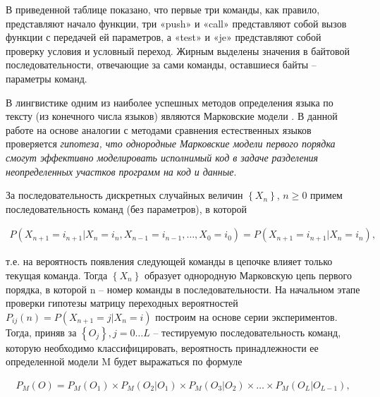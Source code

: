 \documentclass{book}
\begin{document}
В приведенной таблице показано, что первые три команды, как правило, представляют начало 
функции, три «push» и «call» представляют собой вызов функции с передачей ей параметров, 
а «test» и «je» представляют собой проверку условия и условный переход. Жирным выделены 
значения в байтовой последовательности, отвечающие за сами команды, оставшиеся байты – 
параметры команд.

В лингвистике одним из наиболее успешных методов определения языка по тексту
(из конечного числа языков) являются Марковские модели \cite{Silic}. 
В данной работе на основе аналогии 
с методами сравнения естественных языков проверяется \textit{гипотеза, что однородные 
Марковские модели первого порядка смогут эффективно моделировать исполнимый код в задаче 
разделения неопределенных участков программ на код и данные}.

За последовательность дискретных случайных величин  \( \left\lbrace X_{n} \right\rbrace \), 
$n \geq 0$ примем последовательность команд (без параметров), в которой 
\begin{large}
	\begin{equation}\label{eqn:eq1}
		\begin{gathered}
				P(X_{n+1} = i_{n+1} | X_{n} = i_{n}, X_{n-1} = i_{n-1}, \ldots , X_{0} = i_{0}) 
				= P(X_{n+1} = i_{n+1} | X_{n} = i_{n}),
		\end{gathered}
	\end{equation}
\end{large}
т.е. на вероятность появления следующей команды в цепочке влияет только текущая команда. 
Тогда \( \left\lbrace X_{n} \right\rbrace \) образует однородную Марковскую цепь первого порядка, в которой n –
номер команды в последовательности. На начальном этапе проверки гипотезы матрицу
переходных вероятностей $P_{ij}(n) = P(X_{n+1} = j | X_{n} = i)$ построим на основе серии экспериментов. 
Тогда, приняв за  \(\left\lbrace O_{j} \right\rbrace, j = 0 \ldots L \) – тестируемую последовательность 
команд, которую необходимо классифицировать, вероятность принадлежности ее определенной модели M будет 
выражаться по формуле
\begin{large}
	\begin{equation}\label{eqn:eq2}
		\begin{gathered}
			P_{M}(O) = P_{M}(O_{1}) \times P_{M}(O_{2} | O_{1}) \times P_{M}(O_{3} | O_{2}) \times \ldots 
			 \times P_{M}(O_{L} | O_{L-1}),
		\end{gathered}
	\end{equation}
\end{large}
\end{document}
